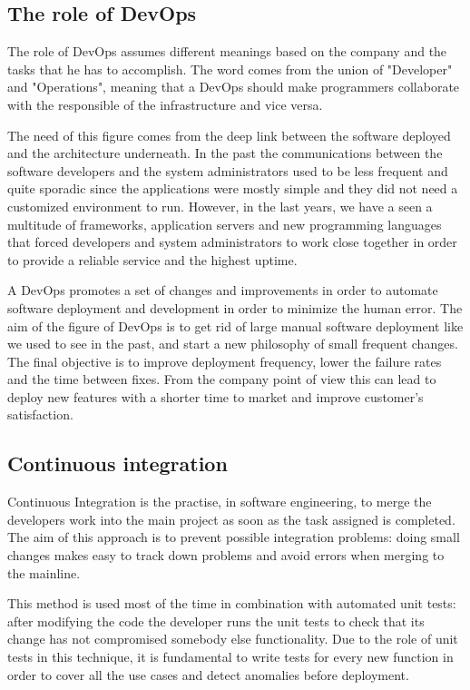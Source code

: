 \subsection{The role of DevOps}

The role of DevOps assumes different meanings based on the company and the
tasks that he has to accomplish. The word comes from the union of
"Developer" and "Operations", meaning that a DevOps should make
programmers collaborate with the responsible of the infrastructure and
vice versa.

The need of this figure comes from the deep link between the software
deployed and the architecture underneath. In the past the communications
between the software developers and the system administrators used to be
less frequent and quite sporadic since the applications were mostly simple
and they did not need a customized environment to run. However, in the
last years, we have a seen a multitude of frameworks, application servers
and new programming languages that forced developers and system
administrators to work close together in order to provide a reliable
service and the highest uptime.

A DevOps promotes a set of changes and improvements in order to automate
software deployment and development in order to minimize the human error.
The aim of the figure of DevOps is to get rid of large manual software
deployment like we used to see in the past, and start a new philosophy of
small frequent changes. The final objective is to improve deployment
frequency, lower the failure rates and the time between fixes. From the
company point of view this can lead to deploy new features with a shorter
time to market and improve customer's satisfaction.

\subsection{Continuous integration}

Continuous Integration is the practise, in software engineering, to merge
the developers work into the main project as soon as the task assigned is
completed. The aim of this approach is to prevent possible integration
problems: doing small changes makes easy to track down problems and avoid
errors when merging to the mainline.

This method is used most of the time in combination with automated unit tests:
after modifying the code the developer runs the unit tests to check that
its change has not compromised somebody else functionality. Due to the
role of unit tests in this technique, it is fundamental to write tests for
every new function in order to cover all the use cases and detect
anomalies before deployment.

